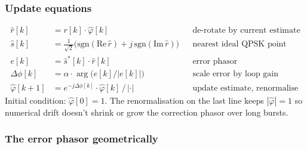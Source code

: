 \documentclass[11pt,a4paper]{article}
\begin{document}
\subsubsection*{Update equations}

\begin{align}
\hat{r}[k]      &= r[k]\cdot \hat{\varphi}[k]                              && \text{de-rotate by current estimate} \\
\hat{s}[k]      &= \tfrac{1}{\sqrt{2}}\bigl(\mathrm{sgn}(\mathrm{Re}\,\hat r) + j\,\mathrm{sgn}(\mathrm{Im}\,\hat r)\bigr)   && \text{nearest ideal QPSK point} \\
e[k]            &= \hat{s}^\ast[k]\cdot \hat{r}[k]                         && \text{error phasor} \\
\Delta\phi[k]   &= \alpha \cdot \arg\bigl(e[k] / |e[k]|\bigr)              && \text{scale error by loop gain} \\
\hat{\varphi}[k+1] &= e^{-j\Delta\phi[k]}\cdot \hat{\varphi}[k] \,/\, |\cdot|  && \text{update estimate, renormalise}
\end{align}
Initial condition: $\hat{\varphi}[0] = 1$. The renormalisation on the
last line keeps $|\hat{\varphi}| = 1$ so numerical drift doesn't shrink
or grow the correction phasor over long bursts.

\subsubsection*{The error phasor geometrically}
\end{document}
